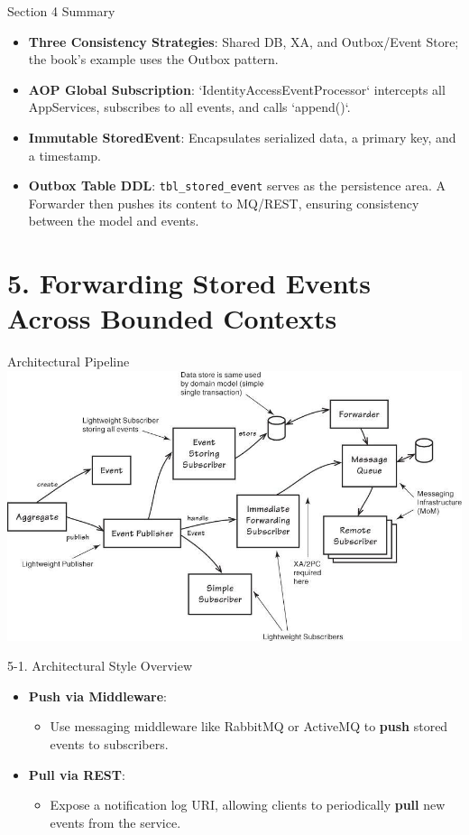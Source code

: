 \documentclass{beamer}
\begin{document}
\begin{frame}{Section 4 Summary}
  \begin{itemize}
    \item \textbf{Three Consistency Strategies}: Shared DB, XA, and Outbox/Event Store; the book's example uses the Outbox pattern.
    \item \textbf{AOP Global Subscription}: `IdentityAccessEventProcessor` intercepts all AppServices, subscribes to all events, and calls `append()`.
    \item \textbf{Immutable StoredEvent}: Encapsulates serialized data, a primary key, and a timestamp.
    \item \textbf{Outbox Table DDL}: \texttt{tbl\_stored\_event} serves as the persistence area. A Forwarder then pushes its content to MQ/REST, ensuring consistency between the model and events.
  \end{itemize}
\end{frame}


\section{5. Forwarding Stored Events Across Bounded Contexts}

\begin{frame}{Architectural Pipeline}
  \includegraphics[width=\textwidth]{img/DomainEvent_ArchitecturePipeline.png}
\end{frame}

\begin{frame}{5-1. Architectural Style Overview}
  \begin{itemize}
    \item \textbf{Push via Middleware}:
      \begin{itemize}
        \item Use messaging middleware like RabbitMQ or ActiveMQ to \textbf{push} stored events to subscribers.
      \end{itemize}
    \item \textbf{Pull via REST}:
      \begin{itemize}
        \item Expose a notification log URI, allowing clients to periodically \textbf{pull} new events from the service.
      \end{itemize}
  \end{itemize}
\end{frame}
\end{document}
